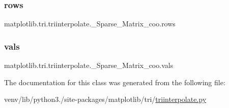\subsubsection{\texorpdfstring{rows}{rows}}
{\footnotesize\ttfamily matplotlib.\+tri.\+triinterpolate.\+\_\+\+Sparse\+\_\+\+Matrix\+\_\+coo.\+rows}

\mbox{\label{classmatplotlib_1_1tri_1_1triinterpolate_1_1__Sparse__Matrix__coo_a5612eaa0dd35a3b3aa32e70b75caf87e}} 
\subsubsection{\texorpdfstring{vals}{vals}}
{\footnotesize\ttfamily matplotlib.\+tri.\+triinterpolate.\+\_\+\+Sparse\+\_\+\+Matrix\+\_\+coo.\+vals}



The documentation for this class was generated from the following file\+:\begin{DoxyCompactItemize}
\item 
venv/lib/python3./site-\/packages/matplotlib/tri/\hyperlink{triinterpolate_8py}{triinterpolate.\+py}\end{DoxyCompactItemize}
